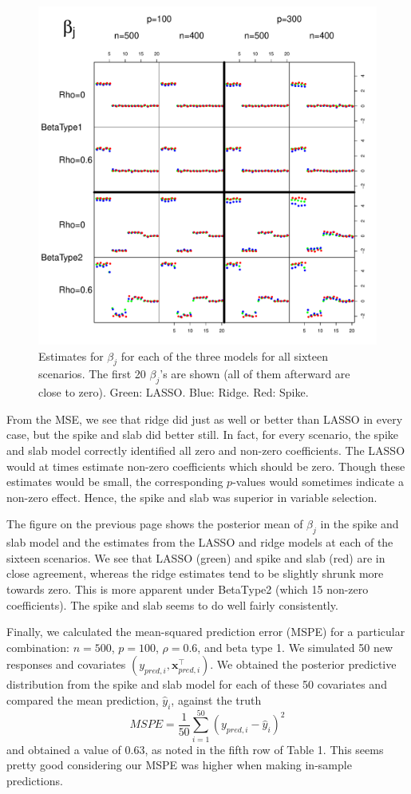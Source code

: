 \documentclass[12pt]{article}
\newcommand{\m}[1]{\mathbf{\bm{#1}}}
\begin{document}
\begin{figure}
\begin{center}
\includegraphics[scale=0.75]{figs/betas.pdf}
\end{center}
\caption{Estimates for $\beta_j$ for each of the three models for all sixteen scenarios. The first 20 $\beta_j$'s are shown (all of them afterward are close to zero). Green: LASSO. Blue: Ridge. Red: Spike.}
\end{figure}

From the MSE, we see that ridge did just as well or better than LASSO in every case, but the spike and slab did better still. In fact, for every scenario, the spike and slab model correctly identified all zero and non-zero coefficients. The LASSO would at times estimate non-zero coefficients which should be zero. Though these estimates would be small, the corresponding $p$-values would sometimes indicate a non-zero effect. Hence, the spike and slab was superior in variable selection.
\bigskip

The figure on the previous page shows the posterior mean of $\beta_j$ in the spike and slab model and the estimates from the LASSO and ridge models at each of the sixteen scenarios. We see that LASSO (green) and spike and slab (red) are in close agreement, whereas the ridge estimates tend to be slightly shrunk more towards zero. This is more apparent under BetaType2 (which 15 non-zero coefficients). The spike and slab seems to do well fairly consistently.
\bigskip

Finally, we calculated the mean-squared prediction error (MSPE) for a particular combination: $n=500$, $p=100$, $\rho=0.6$, and beta type 1. We simulated 50 new responses and covariates $(y_{pred,i}, \m{x}_{pred,i}^\top)$. We obtained the posterior predictive distribution from the spike and slab model for each of these 50 covariates and compared the mean prediction, $\hat{y}_i$, against the truth
\[ MSPE=\frac{1}{50}\sum_{i=1}^{50}(y_{pred,i} - \hat{y}_i)^2 \]
and obtained a value of $0.63$, as noted in the fifth row of Table 1. This seems pretty good considering our MSPE was higher when making in-sample predictions.
\end{document}
